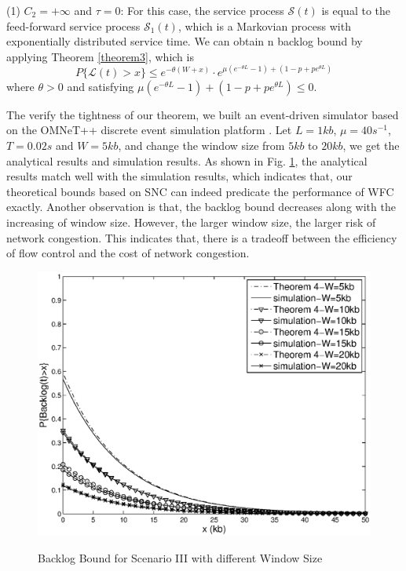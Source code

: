 \documentclass[12pt]{article}
\begin{document}
(1) $C_2=+\infty$ and $\tau=0$: For this case, the service process $\mathcal{S}(t)$ is equal to the feed-forward service process $\mathcal{S}_1(t)$, which is a Markovian process with exponentially distributed service time. We can obtain n backlog bound by applying Theorem \ref{theorem3}, which is
\begin{equation*}\label{equation3}
P\{\mathcal{L}(t)>x\}\leq e^{-\theta(W+x)}\cdot e^{\mu(e^{-\theta L}-1)+(1-p+pe^{\theta L})}
\end{equation*}
where $\theta>0$ and satisfying $\mu(e^{-\theta L}-1)+(1-p+pe^{\theta L})\leq 0$.

The verify the tightness of our theorem, we built an event-driven simulator based on the OMNeT++ discrete event simulation platform \cite{omnetpp}. Let $L=1kb$, $\mu=40s^{-1}$, $T=0.02s$ and $W=5kb$, and change the window size from $5kb$ to $20kb$, we get the analytical results and simulation results. As shown in Fig. \ref{result1}, the analytical results match well with the simulation results, which indicates that, our theoretical bounds based on SNC can indeed predicate the performance of WFC exactly. Another observation is that, the backlog bound decreases along with the increasing of window size. However, the larger window size, the larger risk of network congestion. This indicates that, there is a tradeoff between the efficiency of flow control and the cost of network congestion.
\begin{figure}
  \centering
  \includegraphics[scale=0.45]{figures/backlogbuf.eps}\\
  \caption{Backlog Bound for Scenario III with different Window Size}\label{result1}
\end{figure}
\end{document}
